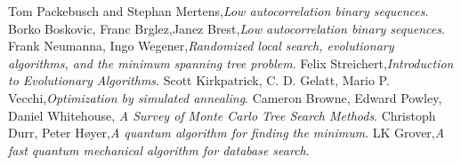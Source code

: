 \documentclass[a4paper,11pt,openany]{article}
\begin{document}

\begin{thebibliography}{999}

Tom Packebusch and Stephan Mertens,\emph{Low autocorrelation binary sequences}. 
Borko Boskovic, Franc Brglez,Janez Brest,\emph{Low autocorrelation binary sequences}. 
Frank Neumanna, Ingo Wegener,\emph{Randomized local search, evolutionary algorithms, and the minimum spanning tree problem}.  
Felix Streichert,\emph{Introduction to Evolutionary Algorithms}. 
Scott Kirkpatrick, C. D. Gelatt, Mario P. Vecchi,\emph{Optimization by simulated annealing}.
Cameron Browne, Edward Powley, Daniel Whitehouse,\emph{ A Survey of Monte Carlo Tree Search Methods}.  
Christoph Durr, Peter Høyer,\emph{A quantum algorithm for finding the minimum}.   
LK Grover,\emph{A fast quantum mechanical algorithm for database search}. 
\end{thebibliography}
\end{document}
